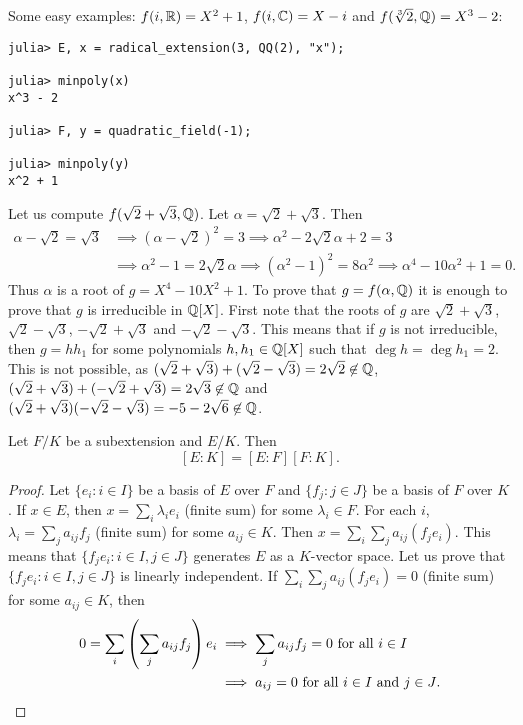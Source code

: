 Some easy examples: $f(i,\mathbb{R})=X^2+1$, 
$f(i,\mathbb{C})=X-i$ and 
$f(\sqrt[3]{2},\mathbb{Q})=X^3-2$:
\begin{lstlisting}
julia> E, x = radical_extension(3, QQ(2), "x");

julia> minpoly(x)
x^3 - 2

julia> F, y = quadratic_field(-1);

julia> minpoly(y)
x^2 + 1
\end{lstlisting}

\begin{example}
	Let us compute 
	$f(\sqrt{2}+\sqrt{3},\mathbb{Q})$. Let $\alpha=\sqrt{2}+\sqrt{3}$. 
	Then 
	\begin{align*}
		\alpha-\sqrt{2}=\sqrt{3} & \implies 
		(\alpha-\sqrt{2})^2=3 \implies \alpha^2-2\sqrt{2}\alpha+2=3\\
		&\implies \alpha^2-1=2\sqrt{2}\alpha \implies
		(\alpha^2-1)^2=8\alpha^2\implies
		\alpha^4-10\alpha^2+1=0.
	\end{align*}
	Thus $\alpha$ is a root of $g=X^4-10X^2+1$. To prove that $g=f(\alpha,\mathbb{Q})$ 
	it is enough to prove that 
	$g$ is irreducible in $\mathbb{Q}[X]$. First note that 
	the roots
	of $g$ are $\sqrt{2}+\sqrt{3}$, $\sqrt{2}-\sqrt{3}$, 
	$-\sqrt{2}+\sqrt{3}$ and $-\sqrt{2}-\sqrt{3}$. This means that
	if $g$ is not irreducible, 
	then $g=hh_1$ for some polynomials $h,h_1\in\mathbb{Q}[X]$ such that
	$\deg h=\deg h_1=2$. This is not possible, as 
	$(\sqrt{2}+\sqrt{3})+(\sqrt{2}-\sqrt{3})=2\sqrt{2}\not\in\mathbb{Q}$, 
	$(\sqrt{2}+\sqrt{3})+(-\sqrt{2}+\sqrt{3})=2\sqrt{3}\not\in\mathbb{Q}$ and 
	$(\sqrt{2}+\sqrt{3})(-\sqrt{2}-\sqrt{3})=-5-2\sqrt{6}\not\in\mathbb{Q}$.
\end{example}


\begin{proposition}
	Let $F/K$ be a subextension and $E/K$. Then
	\[
	[E:K]=[E:F][F:K].
	\]
\end{proposition}

\begin{proof}
	Let $\{e_i:i\in I\}$ be a basis of $E$ over $F$
	and $\{f_j:j\in J\}$ be a basis of $F$ over $K$. If $x\in E$,
	then $x=\sum_i \lambda_ie_i$ (finite sum) 
	for some $\lambda_i\in F$. For each $i$, 
	$\lambda_i=\sum_j a_{ij}f_j$ (finite sum)
	for some $a_{ij}\in K$. Then 
	$x=\sum_i\sum_j a_{ij}(f_je_i)$. This means
	that $\{f_je_i:i\in I,j\in J\}$ generates
	$E$ as a $K$-vector space. Let us prove that 
	$\{f_je_i:i\in I,j\in J\}$
	is linearly independent. If $\sum_i\sum_j a_{ij}(f_je_i)=0$ (finite sum)
	for some $a_{ij}\in K$, 
	then
	\begin{align*}
		0=\sum_i\left(\sum_j a_{ij}f_j\right)e_i&\implies
		\sum_j a_{ij}f_j=0\text{ for all $i\in I$}\\
		&\implies 
		a_{ij}=0\text{ for all $i\in I$ and $j\in J$}.\qedhere
	\end{align*}
\end{proof}

